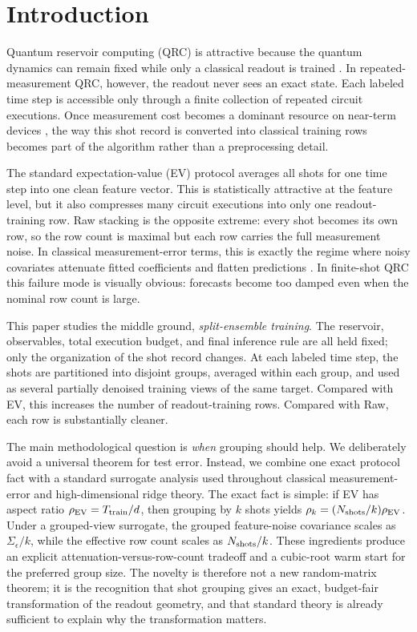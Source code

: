 \section{Introduction}
\label{sec:intro}

Quantum reservoir computing (QRC) is attractive because the quantum dynamics can remain fixed while only a classical readout is trained \cite{maass2002real,lukosevicius2009reservoir,tanaka2019recent,fujii2017harnessing,nakajima2019boosting,mujal2021opportunities}. In repeated-measurement QRC, however, the readout never sees an exact state. Each labeled time step is accessible only through a finite collection of repeated circuit executions. Once measurement cost becomes a dominant resource on near-term devices \cite{gonthier2022measurements}, the way this shot record is converted into classical training rows becomes part of the algorithm rather than a preprocessing detail.

The standard expectation-value (EV) protocol averages all shots for one time step into one clean feature vector. This is statistically attractive at the feature level, but it also compresses many circuit executions into only one readout-training row. Raw stacking is the opposite extreme: every shot becomes its own row, so the row count is maximal but each row carries the full measurement noise. In classical measurement-error terms, this is exactly the regime where noisy covariates attenuate fitted coefficients and flatten predictions \cite{fuller1987measurement,carroll2006measurement}. In finite-shot QRC this failure mode is visually obvious: forecasts become too damped even when the nominal row count is large.

This paper studies the middle ground, \emph{split-ensemble training}. The reservoir, observables, total execution budget, and final inference rule are all held fixed; only the organization of the shot record changes. At each labeled time step, the shots are partitioned into disjoint groups, averaged within each group, and used as several partially denoised training views of the same target. Compared with EV, this increases the number of readout-training rows. Compared with Raw, each row is substantially cleaner.

The main methodological question is \emph{when} grouping should help. We deliberately avoid a universal theorem for test error. Instead, we combine one exact protocol fact with a standard surrogate analysis used throughout classical measurement-error and high-dimensional ridge theory. The exact fact is simple: if EV has aspect ratio $\rho_{\mathrm{EV}}=T_{\mathrm{train}}/d$, then grouping by $k$ shots yields $\rho_k=(N_{\mathrm{shots}}/k)\rho_{\mathrm{EV}}$. Under a grouped-view surrogate, the grouped feature-noise covariance scales as $\Sigma_\epsilon/k$, while the effective row count scales as $N_{\mathrm{shots}}/k$. These ingredients produce an explicit attenuation-versus-row-count tradeoff and a cubic-root warm start for the preferred group size. The novelty is therefore not a new random-matrix theorem; it is the recognition that shot grouping gives an exact, budget-fair transformation of the readout geometry, and that standard theory is already sufficient to explain why the transformation matters.

